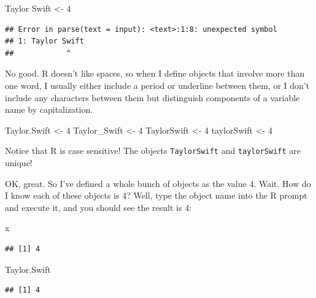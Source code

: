 \documentclass[
]{book}
\newenvironment{Shaded}{\begin{snugshade}}{\end{snugshade}}
\newcommand{\DecValTok}[1]{\textcolor[rgb]{0.00,0.00,0.81}{#1}}
\newcommand{\NormalTok}[1]{#1}
\newcommand{\OtherTok}[1]{\textcolor[rgb]{0.56,0.35,0.01}{#1}}
\begin{document}
\begin{Shaded}
\begin{Highlighting}[]
\NormalTok{Taylor Swift }\OtherTok{\textless{}{-}} \DecValTok{4}
\end{Highlighting}
\end{Shaded}

\begin{verbatim}
## Error in parse(text = input): <text>:1:8: unexpected symbol
## 1: Taylor Swift
##            ^
\end{verbatim}

No good. R doesn't like spaces, so when I define objects that involve more than one word, I usually either include a period or underline between them, or I don't include any characters between them but distinguish components of a variable name by capitalization.

\begin{Shaded}
\begin{Highlighting}[]
\NormalTok{Taylor.Swift }\OtherTok{\textless{}{-}} \DecValTok{4}
\NormalTok{Taylor\_Swift }\OtherTok{\textless{}{-}} \DecValTok{4}
\NormalTok{TaylorSwift }\OtherTok{\textless{}{-}} \DecValTok{4}
\NormalTok{taylorSwift }\OtherTok{\textless{}{-}} \DecValTok{4}
\end{Highlighting}
\end{Shaded}

Notice that R is case sensitive! The objects \texttt{TaylorSwift} and \texttt{taylorSwift} are unique!

OK, great. So I've defined a whole bunch of objects as the value 4. Wait. How do I know each of these objects is 4? Well, type the object name into the R prompt and execute it, and you should see the result is 4:

\begin{Shaded}
\begin{Highlighting}[]
\NormalTok{x}
\end{Highlighting}
\end{Shaded}

\begin{verbatim}
## [1] 4
\end{verbatim}

\begin{Shaded}
\begin{Highlighting}[]
\NormalTok{Taylor.Swift}
\end{Highlighting}
\end{Shaded}

\begin{verbatim}
## [1] 4
\end{verbatim}
\end{document}
